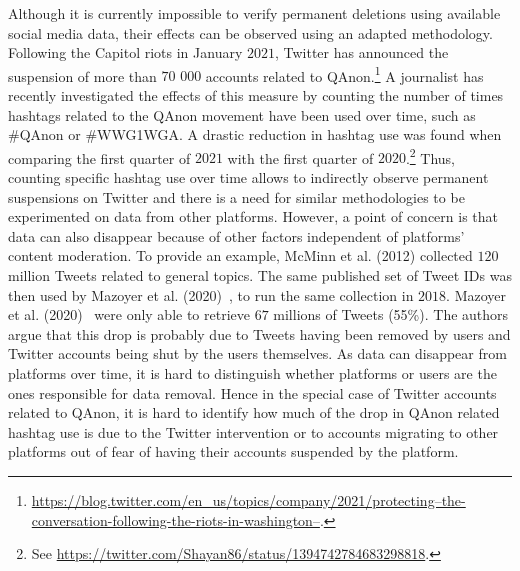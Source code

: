\documentclass{article}
\begin{document}
Although it is currently impossible to verify permanent deletions using available social media data, their effects can be observed using an adapted methodology.
Following the Capitol riots in January $2021$, Twitter has announced the suspension of more than $70$ $000$ accounts related to QAnon.\footnote{\href{https://blog.twitter.com/en\_us/topics/company/2021/protecting--the-conversation-following-the-riots-in-washington--}{https://blog.twitter.com/en\_us/topics/company/2021/protecting--the-conversation-following-the-riots-in-washington--}.} 
A journalist has recently investigated the effects of this measure by counting the number of times hashtags related to the QAnon movement have been used over time, such as \#QAnon or \#WWG1WGA.
A drastic reduction in hashtag use was found when comparing the first quarter of $2021$ with the first quarter of $2020$.\footnote{See \href{https://twitter.com/Shayan86/status/1394742784683298818}{https://twitter.com/Shayan86/status/1394742784683298818}.}
Thus, counting specific hashtag use over time allows to indirectly observe permanent suspensions on Twitter and there is a need for similar methodologies to be experimented on data from other platforms.
However, a point of concern is that data can also disappear because of other factors independent of platforms' content moderation.
To provide an example, McMinn et al. (2012)\cite{mcminn2013building} collected $120$ million Tweets related to general topics. 
The same published set of Tweet IDs was then used by Mazoyer et al. (2020)~\cite{mazoyer2020french}, to run the same collection in $2018$. Mazoyer et al. (2020)~\cite{mazoyer2020french} were only able to retrieve $67$ millions of Tweets (55\%). The authors argue that this drop is probably due to Tweets having been removed by users and Twitter accounts being shut by the users themselves.
As data can disappear from platforms over time, it is hard to distinguish whether platforms or users are the ones responsible for data removal. 
Hence in the special case of Twitter accounts related to QAnon, it is hard to identify how much of the drop in QAnon related hashtag use is due to the Twitter intervention or to accounts migrating to other platforms out of fear of having their accounts suspended by the platform.

\smallskip 
\end{document}
